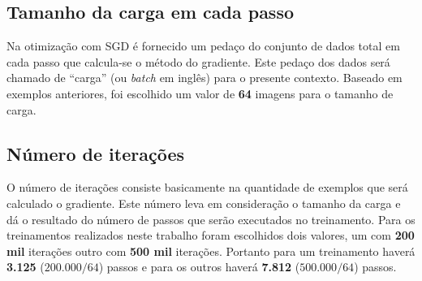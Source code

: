 \subsection{Tamanho da carga em cada passo}

Na otimização com SGD é fornecido um pedaço do conjunto de dados
total em cada passo que calcula-se o método do gradiente. Este pedaço
dos dados será chamado de ``carga'' (ou \textit{batch} em inglês) para
o presente contexto. Baseado em exemplos anteriores, foi escolhido um
valor de {\bf 64} imagens para o tamanho de carga.

\subsection{Número de iterações}

O número de iterações consiste basicamente na quantidade de exemplos
que será calculado o gradiente. Este número leva em consideração o
tamanho da carga e dá o resultado do número de passos que serão
executados no treinamento. Para os treinamentos realizados neste
trabalho foram escolhidos dois valores, um com {\bf 200 mil} iterações
outro com {\bf 500 mil} iterações. Portanto para um treinamento
haverá {\bf 3.125} ($200.000 / 64$) passos e para os outros haverá
{\bf 7.812} ($500.000 / 64$) passos.

